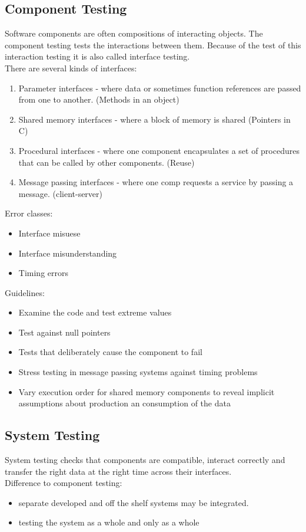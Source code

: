 \documentclass[a4paper,11pt,twocolumn]{report}
\begin{document}
    \subsection{Component Testing}
    Software components are often compositions of interacting objects. The
    component testing tests the interactions between them. Because of the test
    of this interaction testing it is also called interface testing.\\
    There are several kinds of interfaces:
    \begin{enumerate}
        \item Parameter interfaces - where data or sometimes function
            references are passed from one to another. (Methods in an object)
        \item Shared memory interfaces - where a block of memory is shared
            (Pointers in C)
        \item Procedural interfaces - where one component encapsulates a set of
            procedures that can be called by other components. (Reuse)
        \item Message passing interfaces - where one comp requests a service by
            passing a message. (client-server)
    \end{enumerate}
    Error classes:
    \begin{itemize}
        \item Interface misuese
        \item Interface misunderstanding
        \item Timing errors
    \end{itemize}
    Guidelines:
    \begin{itemize}
        \item Examine the code and test extreme values
        \item Test against null pointers
        \item Tests that deliberately cause the component to fail
        \item Stress testing in message passing systems against timing problems
        \item Vary execution order for shared memory components to reveal
            implicit assumptions about production an consumption of the data
    \end{itemize}
    \subsection{System Testing}
    System testing checks that components are compatible, interact correctly
    and transfer the right data at the right time across their interfaces.\\
    Difference to component testing:
    \begin{itemize}
        \item separate developed and off the shelf systems may be integrated.
        \item testing the system as a whole and only as a whole
    \end{itemize}
\end{document}

